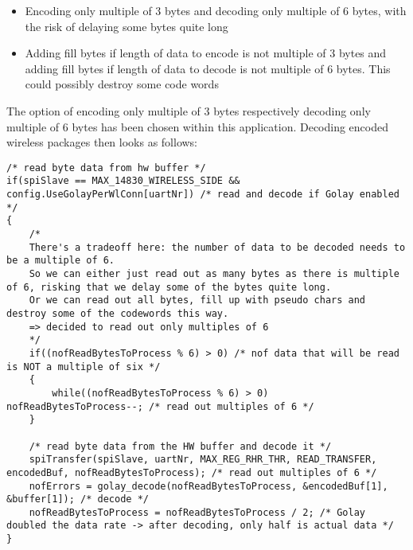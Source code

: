\begin{itemize}
    \item Encoding only multiple of 3 bytes and decoding only multiple of 6 bytes, with the risk of delaying some bytes quite long
    \item Adding fill bytes if length of data to encode is not multiple of 3 bytes and adding fill bytes if length of data to decode is not multiple of 6 bytes. This could possibly destroy some code words
\end{itemize}
The option of encoding only multiple of 3 bytes respectively decoding only multiple of 6 bytes has been chosen within this application. Decoding encoded wireless packages then looks as follows:\\
\begin{lstlisting}
/* read byte data from hw buffer */
if(spiSlave == MAX_14830_WIRELESS_SIDE && config.UseGolayPerWlConn[uartNr]) /* read and decode if Golay enabled */
{
    /*
    There's a tradeoff here: the number of data to be decoded needs to be a multiple of 6.
    So we can either just read out as many bytes as there is multiple of 6, risking that we delay some of the bytes quite long.
    Or we can read out all bytes, fill up with pseudo chars and destroy some of the codewords this way.
    => decided to read out only multiples of 6
    */
    if((nofReadBytesToProcess % 6) > 0) /* nof data that will be read is NOT a multiple of six */
    {
        while((nofReadBytesToProcess % 6) > 0)			nofReadBytesToProcess--; /* read out multiples of 6 */
    }
    
    /* read byte data from the HW buffer and decode it */
    spiTransfer(spiSlave, uartNr, MAX_REG_RHR_THR, READ_TRANSFER, encodedBuf, nofReadBytesToProcess); /* read out multiples of 6 */
    nofErrors = golay_decode(nofReadBytesToProcess, &encodedBuf[1], &buffer[1]); /* decode */
    nofReadBytesToProcess = nofReadBytesToProcess / 2; /* Golay doubled the data rate -> after decoding, only half is actual data */
}
\end{lstlisting}
%
